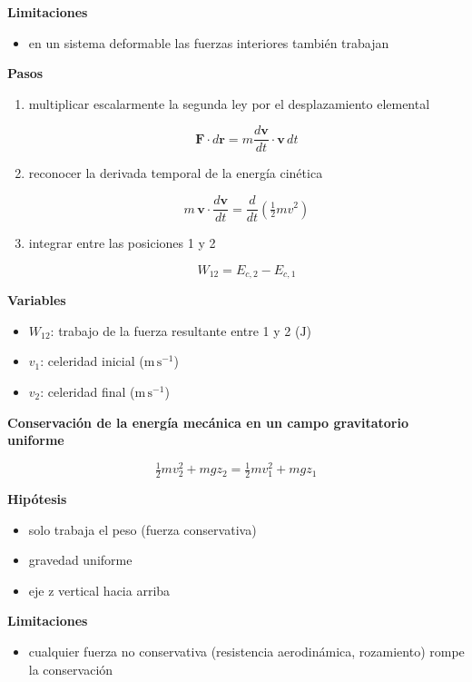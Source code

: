 \documentclass[10pt,openany]{book}
\begin{document}
\begin{tcolorbox}[title={Desarrollos del modelo}, studiumdef, breakable]
\noindent\textbf{Limitaciones}
\begin{itemize}
\item en un sistema deformable las fuerzas interiores también trabajan
\end{itemize}

\noindent\textbf{Pasos}
\begin{enumerate}
\item
multiplicar escalarmente la segunda ley por el desplazamiento elemental

\[
\mathbf{F}\cdot d\mathbf{r} = m\frac{d\mathbf{v}}{dt}\cdot\mathbf{v}\,dt
\]
\item
reconocer la derivada temporal de la energía cinética

\[
m\,\mathbf{v}\cdot\frac{d\mathbf{v}}{dt} = \frac{d}{dt}\left(\tfrac{1}{2}m v^{2}\right)
\]
\item
integrar entre las posiciones 1 y 2

\[
W_{12} = E_{c,2} - E_{c,1}
\]
\end{enumerate}

\noindent\textbf{Variables}
\begin{itemize}
\item $W_{12}$: trabajo de la fuerza resultante entre 1 y 2 ($\mathrm{J}$)
\item $v_{1}$: celeridad inicial ($\mathrm{m}\,\mathrm{s}^{-1}$)
\item $v_{2}$: celeridad final ($\mathrm{m}\,\mathrm{s}^{-1}$)
\end{itemize}



\noindent\textbf{Conservación de la energía mecánica en un campo gravitatorio uniforme}

\[
\tfrac{1}{2}m v_2^{2} + m g z_2 = \tfrac{1}{2}m v_1^{2} + m g z_1
\]

\noindent\textbf{Hipótesis}
\begin{itemize}
\item solo trabaja el peso (fuerza conservativa)
\item gravedad uniforme
\item eje z vertical hacia arriba
\end{itemize}

\noindent\textbf{Limitaciones}
\begin{itemize}
\item cualquier fuerza no conservativa (resistencia aerodinámica, rozamiento) rompe la conservación
\end{itemize}


\end{tcolorbox}
\end{document}
